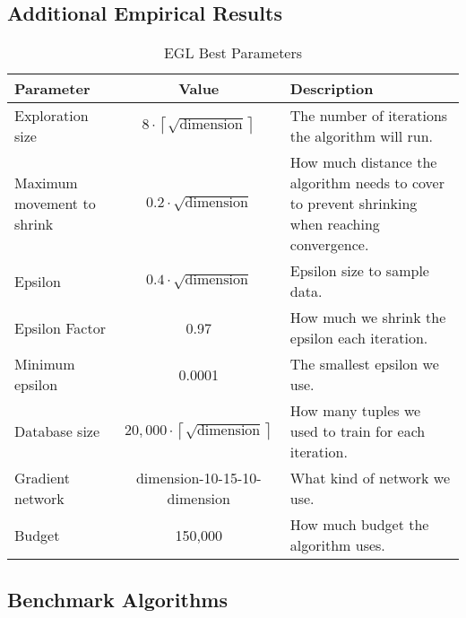 \subsection{Additional Empirical Results}
\begin{table}[H]
    \centering
    \caption{EGL Best Parameters} \label{tab:egl_best_params}
    \vspace{1ex}
    \begin{tabular}{lcp{5cm}}
        \toprule
        \textbf{Parameter} & \textbf{Value} & \textbf{Description} \\
        \midrule
        Exploration size & $8 \cdot \left\lceil \sqrt{\text{dimension}} \right\rceil$ & The number of iterations the algorithm will run. \\
        Maximum movement to shrink & $0.2 \cdot \sqrt{\text{dimension}}$ & How much distance the algorithm needs to cover to prevent shrinking when reaching convergence. \\
        Epsilon & $0.4 \cdot \sqrt{\text{dimension}}$ & Epsilon size to sample data. \\
        Epsilon Factor & 0.97 & How much we shrink the epsilon each iteration. \\
        Minimum epsilon & 0.0001 & The smallest epsilon we use. \\
        Database size & $20,000 \cdot \left\lceil \sqrt{\text{dimension}} \right\rceil$ & How many tuples we used to train for each iteration. \\
        Gradient network & dimension-10-15-10-dimension & What kind of network we use. \\
        Budget & 150,000 & How much budget the algorithm uses. \\
        \bottomrule
    \end{tabular}
    \vspace{1ex}
\end{table}

\subsection{Benchmark Algorithms}
\label{cma_benchmark_algorithm}

